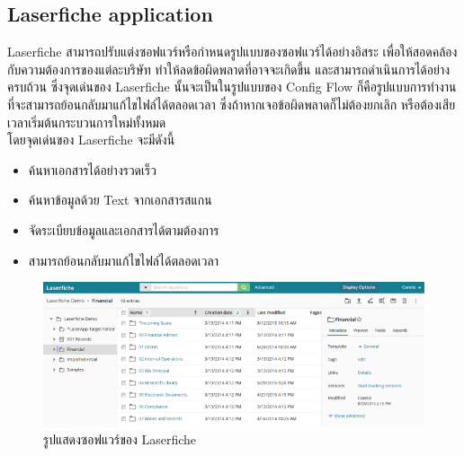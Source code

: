 \documentclass[12pt,oneside,openright,a4paper]{cpe-thai-project}
\begin{document}
\subsection{Laserfiche application}
\hspace*{1cm} Laserfiche สามารถปรับแต่งซอฟแวร์หรือกำหนดรูปแบบของซอฟแวร์ได้อย่างอิสระ เพื่อให้สอดคล้องกับความต้องการของแต่ละบริษัท ทำให้ลดข้อผิดพลาดที่อาจจะเกิดขึ้น และสามารถดำเนินการได้อย่างครบถ้วน ซึ่งจุดเด่นของ Laserfiche นั้นจะเป็นในรูปแบบของ Config Flow ก็คือรูปแบบการทำงานที่จะสามารถย้อนกลับมาแก้ไขไฟล์ได้ตลอดเวลา ซึ่งถ้าหากเจอข้อผิดพลาดก็ไม่ต้องยกเลิก หรือต้องเสียเวลาเริ่มต้นกระบวนการใหม่ทั้งหมด \\
\hspace*{1cm} โดยจุดเด่นของ Laserfiche จะมีดังนี้
\begin{itemize}
  \item ค้นหาเอกสารได้อย่างรวดเร็ว
  \item ค้นหาข้อมูลด้วย Text จากเอกสารสแกน
  \item จัดระเบียบข้อมูลและเอกสารได้ตามต้องการ
  \item สามารถย้อนกลับมาแก้ไขไฟล์ได้ตลอดเวลา
\end{itemize}

\begin{figure}[!h]\centering
  \includegraphics[width=13cm]{./assets/laserfiche.png}
  \caption{รูปแสดงซอฟแวร์ของ Laserfiche}\label{fig:laserfiche}
\end{figure}
\end{document}
